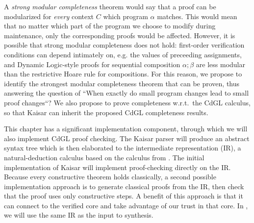 \documentclass[12pt]{cmuthesis}
\theoremstyle{definition}
\theoremstyle{remark}
\newcommand{\rref}[2][]{\prettyref{#2}}
\newcommand{\CdGL}{\textsf{CdGL}\xspace}
\begin{document}
A \emph{strong modular completeness} theorem would say that a proof can be modularized for \emph{every} context $C$ which program $\alpha$ matches.
This would mean that no matter which part of the program we choose to modify during maintenance, only the corresponding proofs would be affected.
However, it is possible that strong modular completeness does not hold: first-order verification conditions can depend intimately on, e.g. the values of preceeding assignments,
and Dynamic Logic-style proofs for sequential composition $\alpha;\beta$ are less modular than the restrictive Hoare rule for compositions.
For this reason, we propose to identify the strongest modular completeness theorem that can be proven, thus answering the question of ``When exactly do small program changes lead to small proof changes``?
We also propose to prove completeness w.r.t.\ the \CdGL calculus, so that Kaisar can inherit the proposed \CdGL completeness results.

This chapter has a significant implementation component, through which we will also implement \CdGL proof checking.
The Kaisar parser will produce an abstract syntax tree which is then elaborated to the intermediate representation (IR), a natural-deduction calculus based on the calculus from \rref{ch:cdgl}.
The initial implementation of Kaisar will implement proof-checking directly on the IR.
Because every constructive theorem holds classically, a second possible implementation approach is to generate classical \dGL proofs from the IR, then check that the proof uses only constructive steps.
A benefit of this approach is that it can connect to the verified \KeYmaeraX core and take advantage of our trust in that core.
In \rref{ch:proofplex}, we will use the same IR as the input to synthesis.
\end{document}
